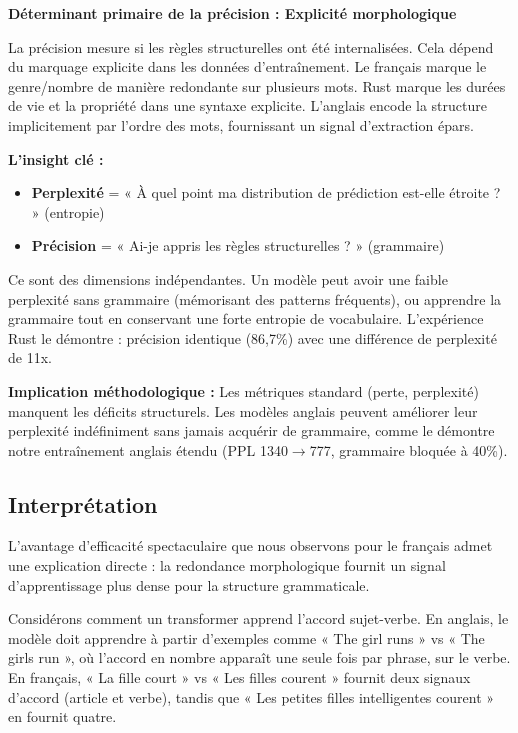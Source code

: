 \documentclass[11pt,a4paper]{article}
\begin{document}
\textbf{Déterminant primaire de la précision : Explicité morphologique}

La précision mesure si les règles structurelles ont été internalisées. Cela dépend du marquage explicite dans les données d'entraînement. Le français marque le genre/nombre de manière redondante sur plusieurs mots. Rust marque les durées de vie et la propriété dans une syntaxe explicite. L'anglais encode la structure implicitement par l'ordre des mots, fournissant un signal d'extraction épars.

\textbf{L'insight clé :}

\begin{itemize}
    \item \textbf{Perplexité} = « À quel point ma distribution de prédiction est-elle étroite ? » (entropie)
    \item \textbf{Précision} = « Ai-je appris les règles structurelles ? » (grammaire)
\end{itemize}

Ce sont des dimensions indépendantes. Un modèle peut avoir une faible perplexité sans grammaire (mémorisant des patterns fréquents), ou apprendre la grammaire tout en conservant une forte entropie de vocabulaire. L'expérience Rust le démontre : précision identique (86,7\%) avec une différence de perplexité de 11x.

\textbf{Implication méthodologique :} Les métriques standard (perte, perplexité) manquent les déficits structurels. Les modèles anglais peuvent améliorer leur perplexité indéfiniment sans jamais acquérir de grammaire, comme le démontre notre entraînement anglais étendu (PPL 1340$\rightarrow$777, grammaire bloquée à 40\%).

\subsection{Interprétation}

L'avantage d'efficacité spectaculaire que nous observons pour le français admet une explication directe : la redondance morphologique fournit un signal d'apprentissage plus dense pour la structure grammaticale.

Considérons comment un transformer apprend l'accord sujet-verbe. En anglais, le modèle doit apprendre à partir d'exemples comme « The girl runs » vs « The girls run », où l'accord en nombre apparaît une seule fois par phrase, sur le verbe. En français, « La fille court » vs « Les filles courent » fournit deux signaux d'accord (article et verbe), tandis que « Les petites filles intelligentes courent » en fournit quatre.
\end{document}
